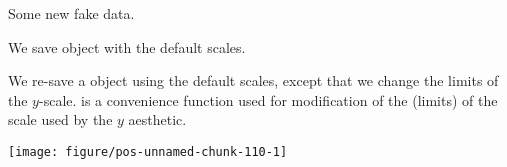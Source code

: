 \documentclass[paper=a4,headsepline,BCOR=12mm,twoside,open=right,%
titlepage,headings=small,fontsize=10pt,index=totoc,bibliography=totoc,%
captions=tableheading,captions=nooneline]{scrbook}\usepackage{knitr}
\begin{document}
Some new fake data.

\begin{knitrout}\footnotesize
{}\color{fgcolor}\begin{kframe}
\begin{alltt}
 \hlkwb{<-}
  \hlstd{(} \hlstd{=} \hlstd{(}\hlstd{(}\hlstd{,} \hlstd{=}\hlstd{,} \hlstd{=}\hlstd{),}
                   \hlstd{(}\hlstd{,} \hlstd{=}\hlstd{,} \hlstd{=}\hlstd{)),}
              \hlstd{=} \hlstd{(}\hlstd{(}\hlstd{(}\hlstd{,} \hlstd{),} \hlstd{(}\hlstd{,} \hlstd{))),}
              \hlstd{=} \hlstd{(}\hlstd{,} \hlstd{=}\hlstd{,} \hlstd{=}\hlstd{))}
\end{alltt}
\end{kframe}
\end{knitrout}

We save  object with the default scales.

\begin{knitrout}\footnotesize
{}\color{fgcolor}\begin{kframe}
\begin{alltt}
 \hlkwb{<-}   \hlopt{+} \hlstd{()}
\end{alltt}
\end{kframe}
\end{knitrout}

We re-save a  object using the default scales, except that we change the limits of the $y$-scale.  is a convenience function used for modification of the  (limits) of the scale used by the $y$ aesthetic.

\begin{knitrout}\footnotesize
{}\color{fgcolor}\begin{kframe}
\begin{alltt}
 \hlopt{+} \hlstd{(}\hlstd{,} \hlstd{)}
\end{alltt}
\end{kframe}

{\centering \texttt{[image: figure/pos-unnamed-chunk-110-1]} 

}



\end{knitrout}
\end{document}
